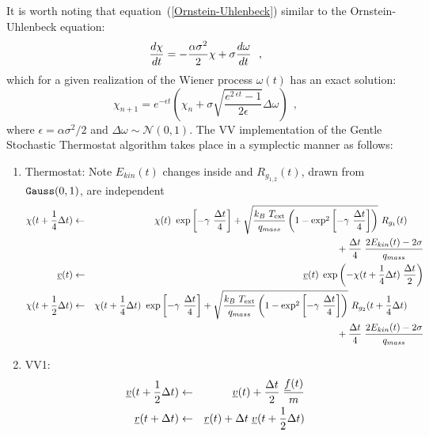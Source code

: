 It is worth noting that equation~(\ref{Ornstein-Uhlenbeck}) similar
to the Ornstein-Uhlenbeck equation:
\begin{equation}
{d \chi \over dt} = -\frac{\alpha\sigma^{2}}{2}\chi + \sigma {d \omega \over dt}~~,
\end{equation}
which for a given realization of the Wiener process $\omega(t)$ has
an exact solution:
\begin{equation}
\chi_{n+1} = e^{-\epsilon t} \left( \chi_{n} + \sigma
\sqrt{\frac{e^{2~\epsilon t} - 1}{2 \epsilon}} \Delta \omega \right)~~,
\end{equation}
where $\epsilon = \alpha\sigma^{2}/2$ and $\Delta \omega \sim \mathcal{N}(0,1)$.
The VV implementation of the Gentle Stochastic Thermostat algorithm
takes place in a symplectic manner as follows:
\begin{enumerate}
\item Thermostat: Note $E_{kin}(t)$ changes inside and $R_{g_{1,2}}(t)$, drawn from ${\tt Gauss}(0,1)$, are independent
\begin{eqnarray}
\chi (t + {1 \over 4} \Delta t) &\leftarrow& \chi (t) ~ \exp \left[-\gamma~{\Delta t \over 4} \right] +
\sqrt{\frac{k_{B}~T_{\rm ext}}{q_{mass}}\left(1-\exp^{2} \left[-\gamma~{\Delta t \over 4} \right]\right)}~R_{g_{1}}(t) \phantom{xxx} \nonumber \\
& &\phantom{xxxxxxxxxxxxxxxx} + {\Delta t \over 4} \; {{2 E_{kin}(t) - 2 \sigma} \over q_{mass}} \nonumber \\
\mbox{$\underline{v}$}(t) &\leftarrow& \mbox{$\underline{v}$}(t) \; \exp \left(
-\chi (t + {1 \over 4} \Delta t) \; {\Delta t \over 2} \right) \\
\chi (t + {1 \over 2} \Delta t) &\leftarrow& \chi (t + {1 \over 4} \Delta t) ~ \exp \left[-\gamma~{\Delta t \over 4} \right] +
\sqrt{\frac{k_{B}~T_{\rm ext}}{q_{mass}}\left(1-\exp^{2} \left[-\gamma~{\Delta t \over 4} \right]\right)}~R_{g_{2}}(t+{1 \over 4} \Delta t) \phantom{xxx} \nonumber \\
& &\phantom{xxxxxxxxxxxxxxxx} + {\Delta t \over 4} \; {{2 E_{kin}(t) - 2 \sigma} \over q_{mass}} \nonumber
\end{eqnarray}
\item VV1:
\begin{eqnarray}
\mbox{$\underline{v}$}(t + {1 \over 2} \Delta t) &\leftarrow& \mbox{$\underline{v}$}(t) +
{\Delta t \over 2} \; {\mbox{$\underline{f}$}(t) \over m} \nonumber \\
\mbox{$\underline{r}$}(t + \Delta t) &\leftarrow& \mbox{$\underline{r}$}(t) + \Delta t \;
\mbox{$\underline{v}$}(t + {1 \over 2} \Delta t)
\end{eqnarray}

\end{enumerate}
